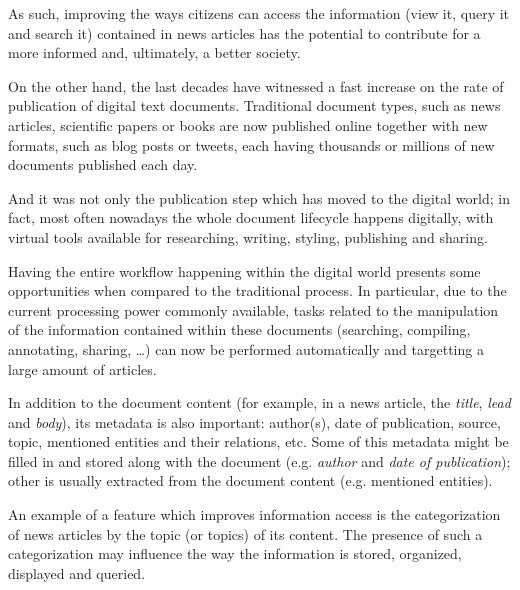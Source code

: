 \documentclass[conference]{IEEEtran}
\begin{document}
As such, improving the ways citizens can access the information (view
it, query it and search it) contained in news articles has the
potential to contribute for a more informed and, ultimately, a
better society\cite{bollinger1988tolerant}.

On the other hand, the last decades have witnessed a fast increase on
the rate of publication of digital text documents. Traditional
document types, such as news articles, scientific papers or books are
now published online together with new formats, such as blog posts or
tweets, each having thousands or millions of new documents published
each day\cite{hilbert2011world,allan2006online}.

And it was not only the publication step which has moved to the
digital world; in fact, most often nowadays the whole document
lifecycle happens digitally, with virtual tools available for
researching, writing, styling, publishing and sharing\cite{williams2009personal}.

Having the entire workflow happening within the digital world presents
some opportunities when compared to the traditional
process\cite{o1997comparison}. In particular, due to the current
processing power commonly available, tasks related to the manipulation
of the information contained within these documents (searching,
compiling, annotating, sharing, \dots) can now be performed
automatically and targetting a large amount of articles.

In addition to the document content (for example, in a news article,
the \emph{title}, \emph{lead} and \emph{body}), its metadata is also
important: author(s), date of publication, source, topic, mentioned
entities and their relations, etc\cite{yaginuma2003metadata,yaginuma2003design}. Some of
this metadata might be filled in and stored along with the document
(e.g. \emph{author} and \emph{date of publication}); other is usually
extracted from the document content (e.g. mentioned
entities)\cite{vadrevu2005automated}.

An example of a feature which improves information access is the
categorization of news articles by the topic (or topics) of its
content\cite{kim2006extracting}. The presence of such a categorization
may influence the way the information is stored, organized, displayed
and queried\cite{teitler2008newsstand}.
\end{document}
